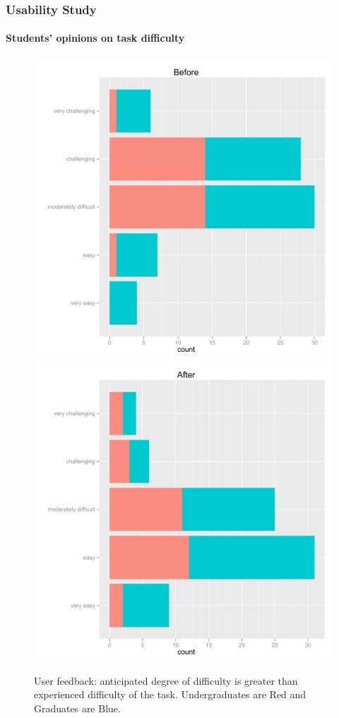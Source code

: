 \documentclass[xcolor=dvipsnames]{beamer}
\begin{document}
\begin{frame}
  \frametitle{Usability Study}
  \framesubtitle{Students' opinions on task difficulty}
\begin{figure}[htbp] %
   \centering

   \includegraphics[width=.5\linewidth,  keepaspectratio=true]{fb-before.pdf} 
   \includegraphics[width=.5\linewidth,  keepaspectratio=true]{fb-after.pdf} 
   \caption{User feedback: anticipated degree of difficulty is greater than experienced difficulty of the task. Undergraduates are Red and Graduates are Blue.}
   \label{fb-before-after}
\end{figure}
\end{frame}
\end{document}
